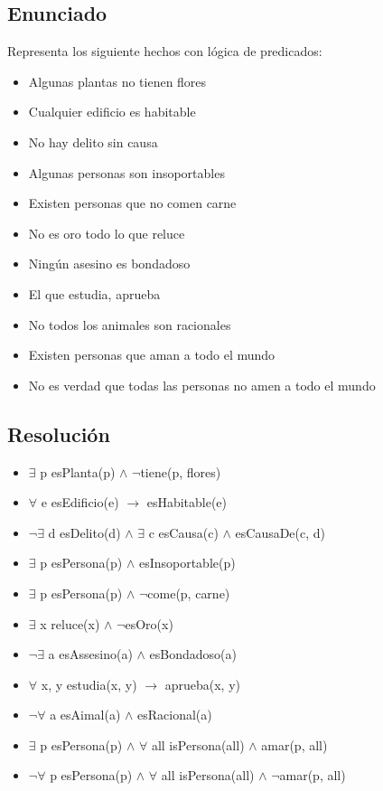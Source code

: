 \documentclass[a4paper,10pt]{article}
\begin{document}
\subsection{Enunciado}
Representa los siguiente hechos con lógica de predicados:
\begin{itemize}
    \item Algunas plantas no tienen flores
    \item Cualquier edificio es habitable
    \item No hay delito sin causa
    \item Algunas personas son insoportables
    \item Existen personas que no comen carne
    \item No es oro todo lo que reluce
    \item Ningún asesino es bondadoso
    \item El que estudia, aprueba
    \item No todos los animales son racionales
    \item Existen personas que aman a todo el mundo
    \item No es verdad que todas las personas no amen a todo el mundo
\end{itemize}
\subsection{Resolución}
\begin{itemize}
    \item $\exists$ p esPlanta(p) $\land$ $\neg$tiene(p, flores)
    \item $\forall$ e esEdificio(e) $\rightarrow$ esHabitable(e)
    \item $\neg$$\exists$ d esDelito(d) $\land$ $\exists$ c esCausa(c) $\land$ esCausaDe(c, d)
    \item $\exists$ p esPersona(p) $\land$ esInsoportable(p)
    \item $\exists$ p esPersona(p) $\land$ $ \neg$come(p, carne)
    \item $\exists$ x reluce(x) $\land$ $\neg$esOro(x)
    \item $\neg$$\exists$ a esAssesino(a) $\land$ esBondadoso(a)
    \item $\forall$ x, y estudia(x, y) $\rightarrow$ aprueba(x, y)
    \item $\neg\forall$ a esAimal(a) $\land$ esRacional(a)
    \item $\exists$ p esPersona(p) $\land$ $\forall$ all isPersona(all) $\land$ amar(p, all)
    \item $\neg\forall$ p esPersona(p) $\land$ $\forall$ all isPersona(all) $\land$ $\neg$amar(p, all)
\end{itemize}
\pagebreak
\end{document}
